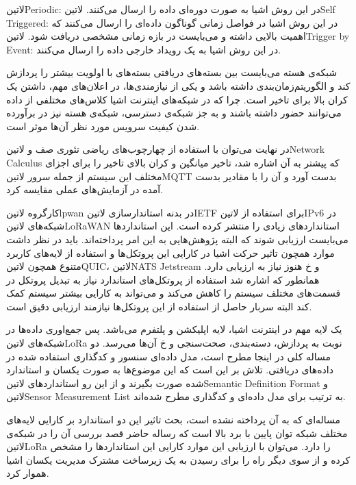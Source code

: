  ‌لاتین{Periodic}: در این روش اشیا به صورت دوره‌ای داده را ارسال می‌کنند.
 ‌لاتین{Self Triggered}: در این روش اشیا در فواصل زمانی گوناگون داده‌ای را ارسال می‌کنند که اهمیت بالایی داشته و می‌بایست در بازه زمانی مشخصی دریافت شود.
 ‌لاتین{Trigger by Event}: در این روش اشیا به یک رویداد خارجی داده را ارسال می‌کنند.

شبکه‌ی هسته می‌بایست بین بسته‌های دریافتی بسته‌های با اولویت بیشتر را پردازش کند و الگوریتم‌زمان‌بندی داشته باشد و یکی از نیازمندی‌ها، در اعلان‌های مهم، داشتن یک کران بالا برای تاخیر است.
چرا که در شبکه‌های اینترنت اشیا کلاس‌های مختلفی از داده می‌توانند حضور داشته باشند و به جز شبکه‌ی دسترسی، شبکه‌ی هسته نیز در برآورده شدن کیفیت سرویس مورد نظر آن‌ها موثر است.

در نهایت می‌توان با استفاده از چهارچوب‌های ریاضی تئوری صف و ‌لاتین{Network Calculus} که پیشتر به آن اشاره شد،
تاخیر میانگین و کران بالای تاخیر را برای اجزای مختلف این سیستم از جمله
سرور ‌لاتین{MQTT} بدست آورد و آن را با مقادیر بدست آمده در آزمایش‌های عملی
مقایسه کرد.


کارگروه ‌لاتین{lpwan} در بدنه استاندارسازی ‌لاتین{IETF} برای استفاده از ‌لاتین{IPv6} در شبکه‌های ‌لاتین{LoRaWAN} استانداردهای زیادی را منتشر کرده است.
این استانداردها می‌بایست ارزیابی شوند که البته پژوهش‌هایی به این امر پرداخته‌اند. باید در نظر داشت موارد همچون تاثیر حرکت اشیا در کارایی این پروتکل‌ها و استفاده از لایه‌های کاربرد متنوع همچون ‌لاتین{QUIC}، ‌لاتین{NATS Jetstream} و ‌خ هنوز نیاز به ارزیابی دارد.
همانطور که اشاره شد استفاده از پروتکل‌های استاندارد نیاز به تبدیل پروتکل در قسمت‌های مختلف سیستم را کاهش می‌کند و می‌تواند به کارایی بیشتر سیستم کمک کند البته سربار حاصل از استفاده از این پروتکل‌ها نیازمند ارزیابی دقیق است.


یک لایه مهم در اینترنت اشیا، لایه اپلیکشن و پلتفرم می‌باشد. پس جمع‌اوری داده‌ها در شبکه‌های ‌لاتین{LoRa} نوبت به پردازش، دسته‌بندی، صحت‌سنجی و ‌خ
آن‌ها می‌رسد. دو مساله کلی در اینجا مطرح است، مدل داده‌ای سنسور و کدگذاری استفاده شده در داده‌های دریافتی. تلاش بر این است که این موضوع‌ها به صورت
یکسان و استاندارد شده صورت بگیرند و از این رو استانداردهای ‌لاتین{Semantic Definition Format} و ‌لاتین{Sensor Measurement List} به ترتیب برای مدل داده‌ای و کدگذاری مطرح شده‌اند.

مساله‌ای که به آن پرداخته نشده است، بحث تاثیر این دو استاندارد بر کارایی لایه‌های مختلف شبکه توان پایین با برد بالا است که رساله حاضر قصد بررسی آن را در شبکه‌ی ‌لاتین{LoRa} را دارد.
می‌توان با ارزیابی این موارد کارایی این استانداردها را مشخص کرده و از سوی دیگر راه را برای رسیدن به یک زیرساخت مشترک مدیریت یکسان اشیا هموار کرد.

